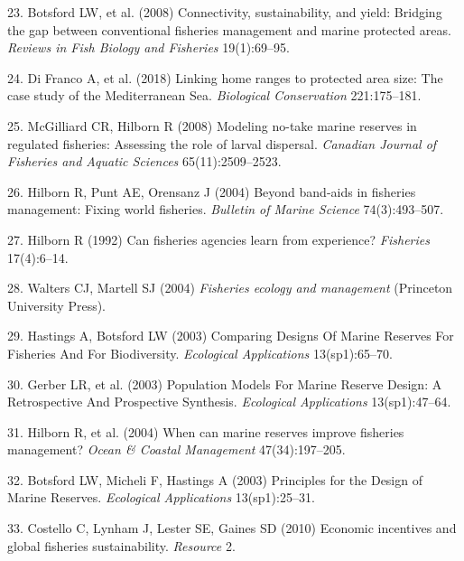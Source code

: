\documentclass[9pt,twocolumn,twoside,lineno]{pnas-new}
\begin{document}
\leavevmode\hypertarget{ref-botsford2008}{}%
23. Botsford LW, et al. (2008) Connectivity, sustainability, and yield:
Bridging the gap between conventional fisheries management and marine
protected areas. \emph{Reviews in Fish Biology and Fisheries}
19(1):69--95.

\leavevmode\hypertarget{ref-difranco2018}{}%
24. Di Franco A, et al. (2018) Linking home ranges to protected area
size: The case study of the Mediterranean Sea. \emph{Biological
Conservation} 221:175--181.

\leavevmode\hypertarget{ref-mcgilliard2008}{}%
25. McGilliard CR, Hilborn R (2008) Modeling no-take marine reserves in
regulated fisheries: Assessing the role of larval dispersal.
\emph{Canadian Journal of Fisheries and Aquatic Sciences}
65(11):2509--2523.

\leavevmode\hypertarget{ref-hilborn2004}{}%
26. Hilborn R, Punt AE, Orensanz J (2004) Beyond band-aids in fisheries
management: Fixing world fisheries. \emph{Bulletin of Marine Science}
74(3):493--507.

\leavevmode\hypertarget{ref-hilborn1992}{}%
27. Hilborn R (1992) Can fisheries agencies learn from experience?
\emph{Fisheries} 17(4):6--14.

\leavevmode\hypertarget{ref-walters2004}{}%
28. Walters CJ, Martell SJ (2004) \emph{Fisheries ecology and
management} (Princeton University Press).

\leavevmode\hypertarget{ref-hastings2003}{}%
29. Hastings A, Botsford LW (2003) Comparing Designs Of Marine Reserves
For Fisheries And For Biodiversity. \emph{Ecological Applications}
13(sp1):65--70.

\leavevmode\hypertarget{ref-gerber2003}{}%
30. Gerber LR, et al. (2003) Population Models For Marine Reserve
Design: A Retrospective And Prospective Synthesis. \emph{Ecological
Applications} 13(sp1):47--64.

\leavevmode\hypertarget{ref-hilborn2004a}{}%
31. Hilborn R, et al. (2004) When can marine reserves improve fisheries
management? \emph{Ocean \& Coastal Management} 47(34):197--205.

\leavevmode\hypertarget{ref-botsford2003}{}%
32. Botsford LW, Micheli F, Hastings A (2003) Principles for the Design
of Marine Reserves. \emph{Ecological Applications} 13(sp1):25--31.

\leavevmode\hypertarget{ref-costello2010}{}%
33. Costello C, Lynham J, Lester SE, Gaines SD (2010) Economic
incentives and global fisheries sustainability. \emph{Resource} 2.
\end{document}
